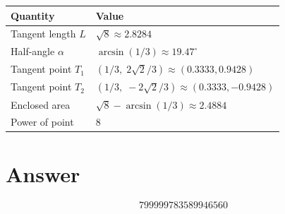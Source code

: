 \documentclass[11pt,a4paper]{article}
\begin{document}
\begin{center}
\begin{tabular}{ll}
\toprule
\textbf{Quantity} & \textbf{Value} \\
\midrule
Tangent length $L$ & $\sqrt{8} \approx 2.8284$ \\
Half-angle $\alpha$ & $\arcsin(1/3) \approx 19.47^\circ$ \\
Tangent point $T_1$ & $(1/3,\; 2\sqrt{2}/3) \approx (0.3333, 0.9428)$ \\
Tangent point $T_2$ & $(1/3,\; -2\sqrt{2}/3) \approx (0.3333, -0.9428)$ \\
Enclosed area & $\sqrt{8} - \arcsin(1/3) \approx 2.4884$ \\
Power of point & $8$ \\
\bottomrule
\end{tabular}
\end{center}

\section{Answer}

\[
\boxed{799999783589946560}
\]
\end{document}
